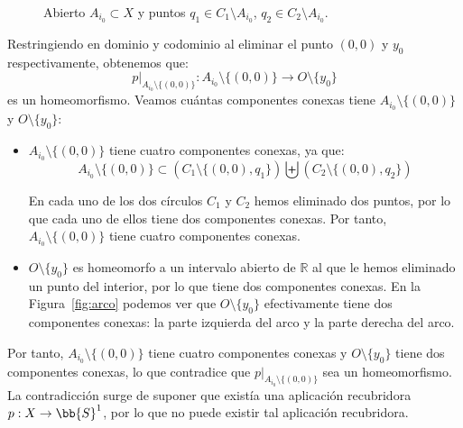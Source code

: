 \documentclass[12pt]{article}
\begin{document}
\begin{ejercicio}
\begin{enumerate}[label=\alph*)]
\begin{description}
\begin{figure}[h]
                        \caption{Abierto $A_{i_0}\subset X$ y puntos $q_1 \in C_1 \setminus A_{i_0}$, $q_2 \in C_2 \setminus A_{i_0}$.}
                        \label{fig:abierto}
                    \end{figure}
                    
                    
                    Restringiendo en dominio y codominio al eliminar el punto $(0,0)$ y $y_0$ respectivamente, obtenemos que:
                    \begin{equation*}
                        p\big|_{A_{i_0}\setminus \{(0,0)\}}:A_{i_0}\setminus \{(0,0)\}\to O\setminus \{y_0\}
                    \end{equation*}
                    es un homeomorfismo. Veamos cuántas componentes conexas tiene $A_{i_0}\setminus \{(0,0)\}$ y $O\setminus \{y_0\}$:
                    \begin{itemize}
                        \item $A_{i_0}\setminus \{(0,0)\}$ tiene cuatro componentes conexas, ya que:
                        \begin{equation*}
                            A_{i_0}\setminus \{(0,0)\} \subset \left(C_1\setminus \{(0,0), q_1\}\right) \biguplus \left(C_2\setminus \{(0,0), q_2\}\right)
                        \end{equation*}

                        En cada uno de los dos círculos $C_1$ y $C_2$ hemos eliminado dos puntos, por lo que cada uno de ellos tiene dos componentes conexas. Por tanto, $A_{i_0}\setminus \{(0,0)\}$ tiene cuatro componentes conexas.
                        \item $O\setminus \{y_0\}$ es homeomorfo a un intervalo abierto de $\mathbb{R}$ al que le hemos eliminado un punto del interior, por lo que tiene dos componentes conexas. En la Figura~\ref{fig:arco} podemos ver que $O\setminus \{y_0\}$ efectivamente tiene dos componentes conexas: la parte izquierda del arco y la parte derecha del arco.
                    \end{itemize}

                    Por tanto, $A_{i_0}\setminus \{(0,0)\}$ tiene cuatro componentes conexas y $O\setminus \{y_0\}$ tiene dos componentes conexas, lo que contradice que $p\big|_{A_{i_0}\setminus \{(0,0)\}}$ sea un homeomorfismo. La contradicción surge de suponer que existía una aplicación recubridora $p:X\to \bb{S}^1$, por lo que no puede existir tal aplicación recubridora.
                \end{description}


\end{enumerate}
\end{ejercicio}
\end{document}
